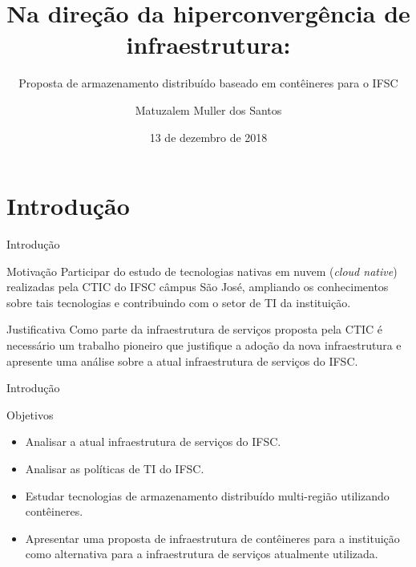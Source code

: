 \documentclass{beamer}
\title{Na direção da hiperconvergência de infraestrutura:}
\subtitle{Proposta de armazenamento distribuído baseado em contêineres para o IFSC}
\author{Matuzalem Muller dos Santos}
\date{13 de dezembro de 2018}
\institute{	Orientador: Ederson Torresini\\
	Coorientador: Jorge Henrique Busatto Casagrande\\
    Engenharia de Telecomunicações\\
	Instituto Federal de Santa Catarina\\
	campus São José\\
}
\begin{document}
\begin{frame}[t]
	\maketitle
\end{frame}



\section{Introdução}

\begin{frame}{Introdução}
    \begin{block}{Motivação}
    Participar do estudo de tecnologias nativas em nuvem (\textit{cloud native}) realizadas pela CTIC do IFSC câmpus São José, ampliando os conhecimentos sobre tais tecnologias e contribuindo com o setor de TI da instituição.
    \end{block}

    \begin{block}{Justificativa}
    Como parte da infraestrutura de serviços proposta pela CTIC é necessário um trabalho pioneiro que justifique a adoção da nova infraestrutura e apresente uma análise sobre a atual infraestrutura de serviços do IFSC.
    \end{block}
 \end{frame}


\begin{frame}{Introdução}
    \begin{block}{Objetivos}
    \begin{itemize}
        \item Analisar a atual infraestrutura de serviços do IFSC.
        \item Analisar as políticas de TI do IFSC.
        \item Estudar tecnologias de armazenamento distribuído multi-região utilizando contêineres.
        \item Apresentar uma proposta de infraestrutura de contêineres para a instituição como alternativa para a infraestrutura de serviços atualmente utilizada.
    \end{itemize}
    \end{block}
\end{frame}
\end{document}
